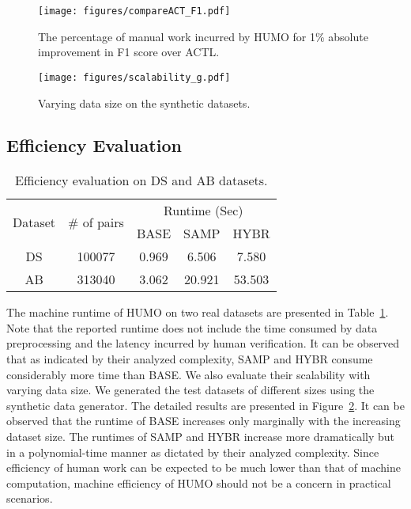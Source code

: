 \begin{figure}
\setlength{\abovecaptionskip}{\figcaptionspace}
\centering
\texttt{[image: figures/compareACT\_F1.pdf]}
\caption{The percentage of manual work incurred by HUMO for 1\% absolute improvement in F1 score over ACTL.}
\label{fig:compare-act}
\vspace{-0.2cm}
\end{figure}

\begin{figure}
\setlength{\abovecaptionskip}{\figcaptionspace}
\centering
{\texttt{[image: figures/scalability\_g.pdf]}}
\caption{Varying data size on the synthetic datasets.}
\label{fig:scalability}
\vspace{-0.6cm}
\end{figure}


\subsection{Efficiency Evaluation} \label{sec:scalability}

\begin{table}
\vspace{-0.4cm}
\centering
\caption{Efficiency evaluation on DS and AB datasets.}
\vspace{-0.1cm}
\label{tab:efficiency-evaluation}
\begin{tabular}{|c|c|c|c|c|}
\hline
\multirow{2}{*}{Dataset} & \multirow{2}{*}{$\#$ of pairs} & \multicolumn{3}{c|}{Runtime (Sec)} \\
\cline{3-5}
&& BASE & SAMP & HYBR \\
\hline
DS & 100077 & 0.969 & 6.506 & 7.580 \\
\hline
AB & 313040 & 3.062 & 20.921 & 53.503 \\
\hline
\end{tabular}
\end{table}

The machine runtime of HUMO on two real datasets are presented in Table~\ref{tab:efficiency-evaluation}. Note that the reported runtime does not include the time consumed by data preprocessing and the latency incurred by human verification. It can be observed that as indicated by their analyzed complexity, SAMP and HYBR consume considerably more time than BASE. We also evaluate their scalability with varying data size. We generated the test datasets of different sizes using the synthetic data generator. The detailed results are presented in Figure~\ref{fig:scalability}. It can be observed that the runtime of BASE increases only marginally with the increasing dataset size. The runtimes of SAMP and HYBR increase more dramatically but in a polynomial-time manner as dictated by their analyzed complexity. Since efficiency of human work can be expected to be much lower than that of machine computation, machine efficiency of HUMO should not be a concern in practical scenarios.

